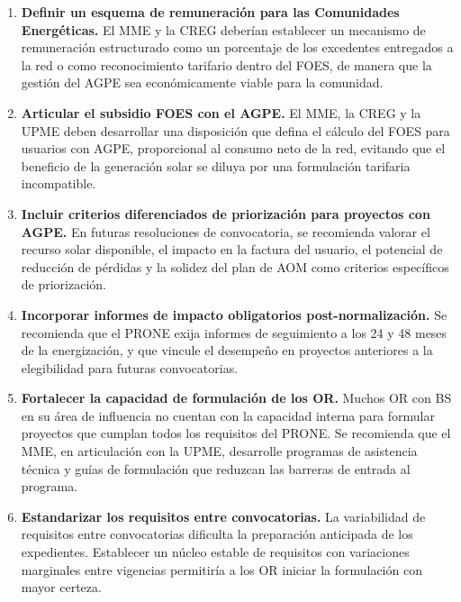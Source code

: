 \begin{enumerate}[label=\textbf{\arabic*.}, leftmargin=1.8cm, itemsep=6pt]

    \item \textbf{Definir un esquema de remuneración para las Comunidades
    Energéticas.} El MME y la CREG deberían establecer un mecanismo de
    remuneración estructurado como un porcentaje de los excedentes
    entregados a la red o como reconocimiento tarifario dentro del FOES,
    de manera que la gestión del AGPE sea económicamente viable para la
    comunidad.

    \item \textbf{Articular el subsidio FOES con el AGPE.} El MME, la
    CREG y la UPME deben desarrollar una disposición que defina el
    cálculo del FOES para usuarios con AGPE, proporcional al consumo
    neto de la red, evitando que el beneficio de la generación solar se
    diluya por una formulación tarifaria incompatible.

    \item \textbf{Incluir criterios diferenciados de priorización para
    proyectos con AGPE.} En futuras resoluciones de convocatoria, se
    recomienda valorar el recurso solar disponible, el impacto en la
    factura del usuario, el potencial de reducción de pérdidas y la
    solidez del plan de AOM como criterios específicos de priorización.

    \item \textbf{Incorporar informes de impacto obligatorios
    post-normalización.} Se recomienda que el PRONE exija informes de
    seguimiento a los 24 y 48 meses de la energización, y que vincule
    el desempeño en proyectos anteriores a la elegibilidad para futuras
    convocatorias.

    \item \textbf{Fortalecer la capacidad de formulación de los OR.}
    Muchos OR con BS en su área de influencia no cuentan con la
    capacidad interna para formular proyectos que cumplan todos los
    requisitos del PRONE. Se recomienda que el MME, en articulación con
    la UPME, desarrolle programas de asistencia técnica y guías de
    formulación que reduzcan las barreras de entrada al programa.

    \item \textbf{Estandarizar los requisitos entre convocatorias.}
    La variabilidad de requisitos entre convocatorias dificulta la
    preparación anticipada de los expedientes. Establecer un núcleo
    estable de requisitos con variaciones marginales entre vigencias
    permitiría a los OR iniciar la formulación con mayor certeza.
\end{enumerate}